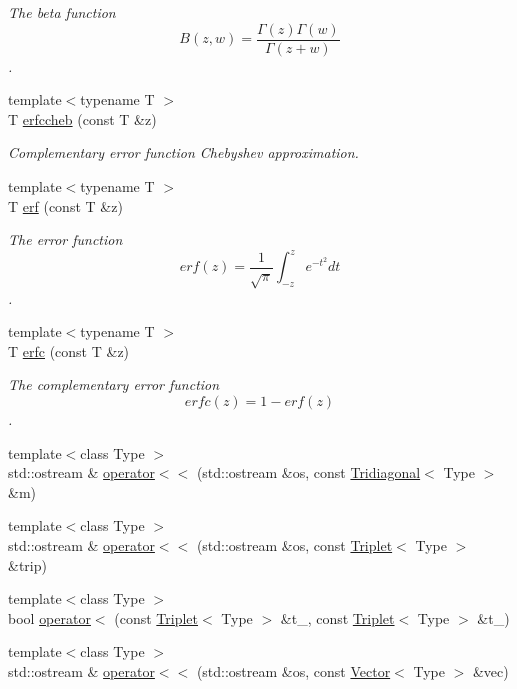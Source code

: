 \begin{DoxyCompactItemize}
\begin{DoxyCompactList}\small\item\em The beta function \[ B(z,w)=\frac{\Gamma(z)\Gamma(w)}{\Gamma(z+w)} \]. \end{DoxyCompactList}\item 
{\footnotesize template$<$typename T $>$ }\\T \hyperlink{namespaceLuna_ac9674d093d4c75954df962781acf9150}{erfccheb} (const T \&z)
\begin{DoxyCompactList}\small\item\em Complementary error function Chebyshev approximation. \end{DoxyCompactList}\item 
{\footnotesize template$<$typename T $>$ }\\T \hyperlink{namespaceLuna_a297d1af9ebec3d1b70600f28ff78f137}{erf} (const T \&z)
\begin{DoxyCompactList}\small\item\em The error function \[ erf(z) = \frac{1}{\sqrt{\pi}} \int_{-z}^{z} e^{-t^2} dt \]. \end{DoxyCompactList}\item 
{\footnotesize template$<$typename T $>$ }\\T \hyperlink{namespaceLuna_aa9ceeb6a99e1f82aa1d4614bcc9653be}{erfc} (const T \&z)
\begin{DoxyCompactList}\small\item\em The complementary error function \[ erfc(z) = 1 - erf(z) \]. \end{DoxyCompactList}\item 
{\footnotesize template$<$class Type $>$ }\\std\+::ostream \& \hyperlink{namespaceLuna_ab75cbe7adbaf8d0e078bdbb91be49994}{operator$<$$<$} (std\+::ostream \&os, const \hyperlink{classLuna_1_1Tridiagonal}{Tridiagonal}$<$ Type $>$ \&m)
\item 
{\footnotesize template$<$class Type $>$ }\\std\+::ostream \& \hyperlink{namespaceLuna_ae16088bac866c2bd6332b598aa0766cb}{operator$<$$<$} (std\+::ostream \&os, const \hyperlink{classLuna_1_1Triplet}{Triplet}$<$ Type $>$ \&trip)
\item 
{\footnotesize template$<$class Type $>$ }\\bool \hyperlink{namespaceLuna_a21985868e4570c7f9aa06566fa74e133}{operator$<$} (const \hyperlink{classLuna_1_1Triplet}{Triplet}$<$ Type $>$ \&t\+\_, const \hyperlink{classLuna_1_1Triplet}{Triplet}$<$ Type $>$ \&t\+\_)
\item 
{\footnotesize template$<$class Type $>$ }\\std\+::ostream \& \hyperlink{namespaceLuna_aa5f07ae9aef05c499669791c1d719e6e}{operator$<$$<$} (std\+::ostream \&os, const \hyperlink{classLuna_1_1Vector}{Vector}$<$ Type $>$ \&vec)
\end{DoxyCompactItemize}



